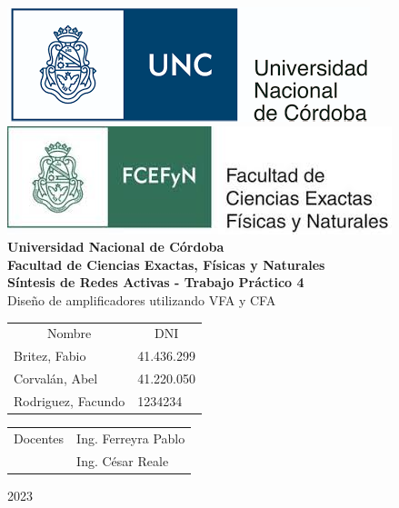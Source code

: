 \documentclass[12pt,A4paper,titlepage]{article}
\begin{document}
\begin{titlepage}

\thispagestyle{empty}



\begin{center}
    \includegraphics[scale=0.4]{Imagenes/unc_logo.png}
    \includegraphics[scale=0.4]{Imagenes/fcefyn_logo.jpg}
    \\[1cm]
    \vspace{5pt}
    \LARGE \textbf{Universidad Nacional de Córdoba}\\[0.5cm] 
    \large \textbf{Facultad de Ciencias Exactas, Físicas y Naturales} \\[0.5cm] 
    \large \textbf{Síntesis de Redes Activas - Trabajo Práctico 4}
    \\[0.5cm]
    \large Diseño de amplificadores utilizando VFA y CFA
    \\[0.2cm] 
    \vspace{60pt}
    \begin{table}[!h]
    \centering
    \begin{tabular}{ll}
    \multicolumn{1}{c}{Nombre} & \multicolumn{1}{c}{DNI} \\
    Britez, Fabio& 41.436.299 \\
    Corvalán, Abel & 41.220.050 \\
    Rodriguez, Facundo & 1234234
    \end{tabular}
    \end{table}
    \vspace{20pt}
    \begin{table}[!h]
    \centering
    \begin{tabular}{ll}
    \multicolumn{1}{c}{Docentes} & Ing. Ferreyra Pablo \\ & Ing. César Reale \\
    \end{tabular}
    \end{table}
    \vspace{20pt}
    \large 2023
\end{center}

\end{titlepage}
\end{document}
